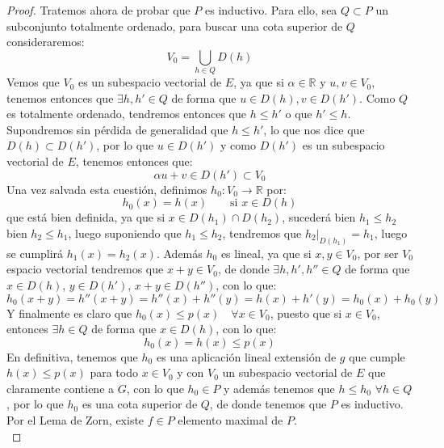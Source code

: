 \begin{teo}
\begin{proof}
        \noindent
        Tratemos ahora de probar que $P$ es inductivo. Para ello, sea $Q\subset P$ un subconjunto totalmente ordenado, para buscar una cota superior de $Q$ consideraremos:
        \begin{equation*}
            V_0 = \bigcup_{h\in Q}D(h)
        \end{equation*}
        Vemos que $V_0$ es un subespacio vectorial de $E$, ya que si $\alpha\in \mathbb{R}$ y $u,v\in V_0$, tenemos entonces que $\exists h,h'\in Q$ de forma que $u\in D(h), v\in D(h')$. Como $Q$ es totalmente ordenado, tendremos entonces que $h\leq h'$ o que $h'\leq h$. Supondremos sin pérdida de generalidad que $h\leq h'$, lo que nos dice que $D(h)\subset D(h')$, por lo que $u\in D(h')$ y como $D(h')$ es un subespacio vectorial de $E$, tenemos entonces que:
        \begin{equation*}
            \alpha u + v \in D(h') \subset V_0
        \end{equation*}
        Una vez salvada esta cuestión, definimos $h_0:V_0\to \mathbb{R}$ por:
        \begin{equation*}
            h_0(x) = h(x) \qquad \text{si\ } x\in D(h)
        \end{equation*}
        que está bien definida, ya que si $x\in D(h_1)\cap D(h_2)$, sucederá bien $h_1 \leq h_2$ bien $h_2 \leq h_1$, luego suponiendo que $h_1\leq h_2$, tendremos que $h_2\big|_{D(h_1)} = h_1$, luego se cumplirá $h_1(x) = h_2(x)$. Además $h_0$ es lineal, ya que si $x,y\in V_0$, por ser $V_0$ espacio vectorial tendremos que $x+y\in V_0$, de donde $\exists h,h',h'' \in Q$ de forma que $x\in D(h)$, $y\in D(h')$, $x+y\in D(h'')$, con lo que:
        \begin{equation*}
            h_0(x+y) = h''(x+y) = h''(x) + h''(y) = h(x) + h'(y) = h_0(x) + h_0(y)
        \end{equation*}
        Y finalmente es claro que $h_0(x) \leq p(x)\quad \forall x\in V_0$, puesto que si $x\in V_0$, entonces $\exists h\in Q$ de forma que $x\in D(h)$, con lo que:
        \begin{equation*}
            h_0(x) = h(x) \leq p(x)
        \end{equation*}
        En definitiva, tenemos que $h_0$ es una aplicación lineal extensión de $g$ que cumple $h(x) \leq p(x)$ para todo $x\in V_0$ y con $V_0$ un subespacio vectorial de $E$ que claramente contiene a $G$, con lo que $h_0\in P$ y además tenemos que $h\leq h_0$ $\forall h\in Q$, por lo que $h_0$ es una cota superior de $Q$, de donde tenemos que $P$ es inductivo. Por el Lema de Zorn, existe $f\in P$ elemento maximal de $P$.\\


\end{proof}
\end{teo}
